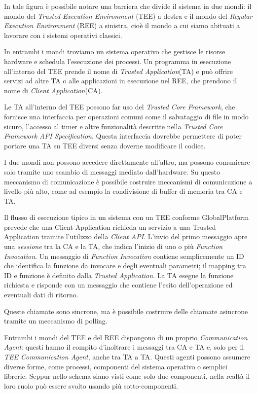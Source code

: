 \documentclass[12pt,italian]{report}
\begin{document}
In tale figura è possibile notare una barriera che divide il sistema in due
mondi: il mondo del \textit{Trusted Execution Environment} (TEE) a destra
e il mondo del \textit{Regular Execution Environment} (REE) a sinistra, cioè
il mondo a cui siamo abituati a lavorare con i sistemi operativi classici.

In entrambi i mondi troviamo un sistema operativo che gestisce le risorse
hardware e schedula l'esecuzione dei processi. Un programma in esecuzione
all'interno del TEE prende il nome di \textit{Trusted Application}(TA) e può
offrire servizi ad altre TA o alle applicazioni in esecuzione nel REE,
che prendono il nome di \textit{Client Application}(CA).

Le TA all'interno del TEE possono far uso del \textit{Trusted Core Framework},
che fornisce una interfaccia per operazioni comuni come il salvataggio
di file in modo sicuro, l'accesso al timer e altre funzionalità descritte
nella
\textit{Trusted Core Framework API Specification}\cite{gp2020internalapi}.
Questa interfaccia dovrebbe permettere di poter portare una TA su TEE diversi
senza doverne modificare il codice.

I due mondi non possono accedere direttamente all'altro, ma possono
comunicare solo tramite uno scambio di messaggi mediato dall'hardware.
Su questo meccanismo di comunicazione è possibile costruire meccanismi di
comunicazione a livello più alto, come ad esempio la condivisione di buffer
di memoria tra CA e TA.

\bigbreak \noindent

Il flusso di esecuzione tipico in un sistema con un TEE conforme GlobalPlatform
prevede che una Client Application richieda un servizio a
una Trusted Application tramite l'utilizzo della \textit{Client API}.
L'invio del primo messaggio apre una \textit{sessione} tra la CA e la TA, che
indica l'inizio di uno o più \textit{Function Invocation}.
Un messaggio di \textit{Function Invocation} contiene semplicemente un ID
che identifica la funzione da invocare e degli eventuali parametri;
il mapping tra ID e funzione è definito dalla \textit{Trusted Application}.
La TA esegue la funzione richiesta e risponde con un messaggio che contiene
l'esito dell'operazione ed eventuali dati di ritorno.

Queste chiamate sono sincrone, ma è possibile costruire delle chiamate
asincrone tramite un meccanismo di polling.

Entrambi i mondi del TEE e del REE dispongono di un proprio
\textit{Communication Agent}: questi 
hanno il compito d'inoltrare i messaggi tra CA e TA e, solo per il
\textit{TEE Communication Agent}, anche tra TA a TA.
Questi agenti possono assumere diverse forme, come processi, componenti
del sistema operativo o semplici librerie.
Seppur nello schema siano visti come solo due componenti, nella realtà
il loro ruolo può essere svolto usando più sotto-componenti.
\end{document}
